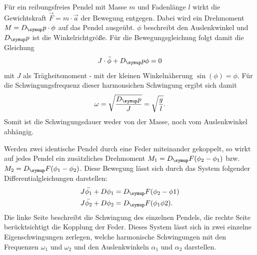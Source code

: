 Für ein reibungsfreies Pendel mit Masse $m$ und Fadenlänge $l$ wirkt die Gewichtskraft
$\vec{F} = m \cdot \vec{a}$ der Bewegung entgegen. Dabei wird ein Drehmoment
$M = D_\su{p} \cdot \phi$ auf das Pendel ausgeübt. $\phi$ beschreibt den Auslenkwinkel
und $D_\su{p}$ ist die Winkelrichtgröße. Für die Bewegungsgleichung folgt damit die
Gleichung
\begin{equation}
  J \cdot \ddot{\phi} + D_\su{p}\phi = 0
\end{equation}
mit $J$ als Trägheitsmoment - mit der kleinen Winkelnäherung $\sin{(\phi)} = \phi$.
Für die Schwingungsfrequenz dieser harmonsichen Schwingung ergibt sich damit
\begin{equation}
  \omega = \sqrt{\frac{D_\su{p}}{J}} = \sqrt{\frac{g}{l}}.
\end{equation}
Somit ist die Schwingungsdauer weder von der Masse, noch vom Auslenkwinkel abhängig.

Werden zwei identische Pendel durch eine Feder miteinander gekoppelt, so wirkt
auf jedes Pendel ein zusätzliches Drehmoment $M_1 = D_\su{F}(\phi_2-\phi_1)$
bzw. $M_2 = D_\su{F}(\phi_1-\phi_2)$. Diese Bewegung lässt sich durch das System
folgender Differentialgleichungen darstellen:
\begin{align}
  J \ddot{\phi_1} + D\phi_1 &= D_\su{F} (\phi_2-\phi1) \\
  J \ddot{\phi_2} + D\phi_2 &= D_\su{F} (\phi_1\phi2) .
\end{align}
Die linke Seite beschreibt die Schwingung des einzelnen Pendels, die rechte Seite
berücktsichtigt die Kopplung der Feder.
Dieses System lässt sich in zwei einzelne Eigenschwingungen zerlegen, welche
harmonische Schwingungen mit den Frequenzen $\omega_1$ und $\omega_2$ und den Auslenkwinkeln
$\alpha_1$ und $\alpha_2$ darstellen.

